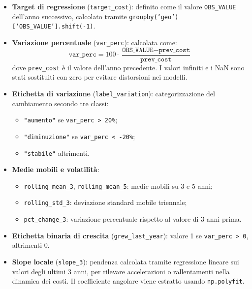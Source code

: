 \documentclass[conference]{IEEEtran}
\begin{document}
\begin{itemize}
    \item \textbf{Target di regressione} (\texttt{target\_cost}): definito come il valore \texttt{OBS\_VALUE} dell’anno successivo, calcolato tramite \texttt{groupby('geo')['OBS\_VALUE'].shift(-1)}.
    
    \item \textbf{Variazione percentuale} (\texttt{var\_perc}): calcolata come:
    \[
    \texttt{var\_perc} = 100 \cdot \frac{\texttt{OBS\_VALUE} - \texttt{prev\_cost}}{\texttt{prev\_cost}}
    \]
    dove \texttt{prev\_cost} è il valore dell’anno precedente. I valori infiniti e i NaN sono stati sostituiti con zero per evitare distorsioni nei modelli.
    
    \item \textbf{Etichetta di variazione} (\texttt{label\_variation}): categorizzazione del cambiamento secondo tre classi:
    \begin{itemize}
        \item \texttt{"aumento"} se \texttt{var\_perc > 20\%};
        \item \texttt{"diminuzione"} se \texttt{var\_perc < -20\%};
        \item \texttt{"stabile"} altrimenti.
    \end{itemize}
    
    \item \textbf{Medie mobili e volatilità}:
    \begin{itemize}
        \item \texttt{rolling\_mean\_3}, \texttt{rolling\_mean\_5}: medie mobili su 3 e 5 anni;
        \item \texttt{rolling\_std\_3}: deviazione standard mobile triennale;
        \item \texttt{pct\_change\_3}: variazione percentuale rispetto al valore di 3 anni prima.
    \end{itemize}
    
    \item \textbf{Etichetta binaria di crescita} (\texttt{grew\_last\_year}): valore 1 se \texttt{var\_perc > 0}, altrimenti 0.
    
    \item \textbf{Slope locale} (\texttt{slope\_3}): pendenza calcolata tramite regressione lineare sui valori degli ultimi 3 anni, per rilevare accelerazioni o rallentamenti nella dinamica dei costi. Il coefficiente angolare viene estratto usando \texttt{np.polyfit}.
\end{itemize}
\end{document}
